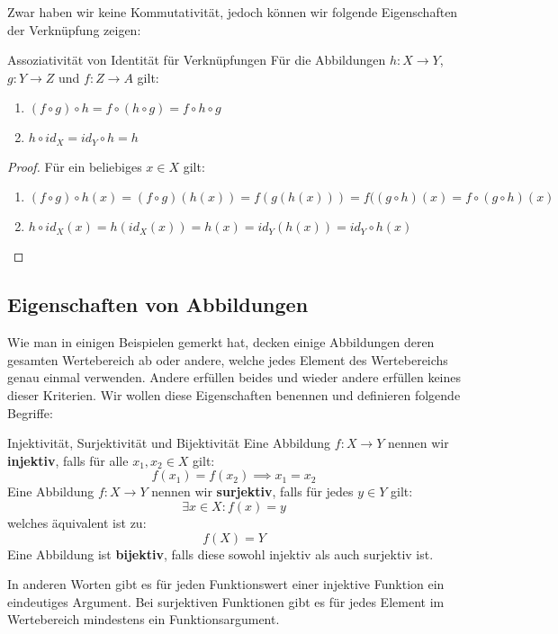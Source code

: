 Zwar haben wir keine Kommutativität, jedoch können wir folgende Eigenschaften der Verknüpfung zeigen:
\begin{satz}{Assoziativität von Identität für Verknüpfungen}{}
Für die Abbildungen $h: X \to Y$, $g: Y \to Z$ und $f: Z \to A$ gilt: 
\begin{enumerate}
    \item $(f\circ g) \circ h = f \circ (h \circ g) = f \circ h \circ g$
    \item $h \circ id_X = id_Y \circ h = h$
\end{enumerate}
\end{satz}
\begin{proof} Für ein beliebiges $x \in X$ gilt:
\begin{enumerate}
    \item $(f\circ g) \circ h(x) = (f\circ g)(h(x)) = f(g(h(x))) = f((g\circ h)(x) = f \circ (g \circ h)(x)$
    \item $h \circ id_X (x) = h(id_X(x)) = h(x) = id_Y(h(x)) = id_Y \circ h (x)$
\end{enumerate}
\end{proof}

\subsection{Eigenschaften von Abbildungen}
Wie man in einigen Beispielen gemerkt hat, decken einige Abbildungen deren gesamten Wertebereich ab oder andere, welche jedes Element des Wertebereichs genau einmal verwenden. Andere erfüllen beides und wieder andere erfüllen keines dieser Kriterien. Wir wollen diese Eigenschaften benennen und definieren folgende Begriffe:

\begin{definition}{Injektivität, Surjektivität und Bijektivität}{}
Eine Abbildung $f: X \to Y$ nennen wir \textbf{injektiv}, falls für alle $x_1, x_2 \in X$ gilt:
$$f(x_1) = f(x_2) \implies x_1 = x_2$$
Eine Abbildung $f: X \to Y$ nennen wir \textbf{surjektiv}, falls für jedes $y \in Y$ gilt:
$$\exists x \in X: f(x)=y$$
welches äquivalent ist zu:
$$f(X) = Y$$
Eine Abbildung ist \textbf{bijektiv}, falls diese sowohl injektiv als auch surjektiv ist.
\end{definition}

In anderen Worten gibt es für jeden Funktionswert einer injektive Funktion ein eindeutiges Argument. Bei surjektiven Funktionen gibt es für jedes Element im Wertebereich mindestens ein Funktionsargument.

